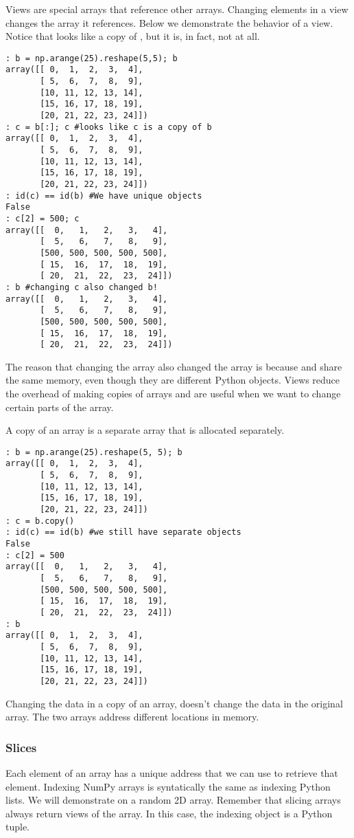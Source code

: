 Views are special arrays that reference other arrays.  Changing elements in a view changes the array it references.  Below we demonstrate the behavior of a view.  Notice that  looks like a copy of , but it is, in fact, not at all.
\begin{lstlisting}
: b = np.arange(25).reshape(5,5); b
array([[ 0,  1,  2,  3,  4],
       [ 5,  6,  7,  8,  9],
       [10, 11, 12, 13, 14],
       [15, 16, 17, 18, 19],
       [20, 21, 22, 23, 24]])
: c = b[:]; c #looks like c is a copy of b
array([[ 0,  1,  2,  3,  4],
       [ 5,  6,  7,  8,  9],
       [10, 11, 12, 13, 14],
       [15, 16, 17, 18, 19],
       [20, 21, 22, 23, 24]])
: id(c) == id(b) #We have unique objects
False
: c[2] = 500; c
array([[  0,   1,   2,   3,   4],
       [  5,   6,   7,   8,   9],
       [500, 500, 500, 500, 500],
       [ 15,  16,  17,  18,  19],
       [ 20,  21,  22,  23,  24]])
: b #changing c also changed b!
array([[  0,   1,   2,   3,   4],
       [  5,   6,   7,   8,   9],
       [500, 500, 500, 500, 500],
       [ 15,  16,  17,  18,  19],
       [ 20,  21,  22,  23,  24]])
\end{lstlisting}

The reason that changing the array  also changed the array  is because  and  share the same memory, even though they are different Python objects.  Views reduce the overhead of making copies of arrays and are useful when we want to change certain parts of the array.

A copy of an array is a separate array that is allocated separately.
\begin{lstlisting}
: b = np.arange(25).reshape(5, 5); b
array([[ 0,  1,  2,  3,  4],
       [ 5,  6,  7,  8,  9],
       [10, 11, 12, 13, 14],
       [15, 16, 17, 18, 19],
       [20, 21, 22, 23, 24]])
: c = b.copy()
: id(c) == id(b) #we still have separate objects
False
: c[2] = 500
array([[  0,   1,   2,   3,   4],
       [  5,   6,   7,   8,   9],
       [500, 500, 500, 500, 500],
       [ 15,  16,  17,  18,  19],
       [ 20,  21,  22,  23,  24]])
: b
array([[ 0,  1,  2,  3,  4],
       [ 5,  6,  7,  8,  9],
       [10, 11, 12, 13, 14],
       [15, 16, 17, 18, 19],
       [20, 21, 22, 23, 24]])
\end{lstlisting}

Changing the data in a copy of an array, doesn't change the data in the original array.  The two arrays address different locations in memory.

\subsubsection*{Slices}
Each element of an array has a unique address that we can use to retrieve that element.  Indexing NumPy arrays is syntatically the same as indexing Python lists.  We will demonstrate on a random 2D array.  Remember that slicing arrays always return views of the array.  In this case, the indexing object is a Python tuple.

